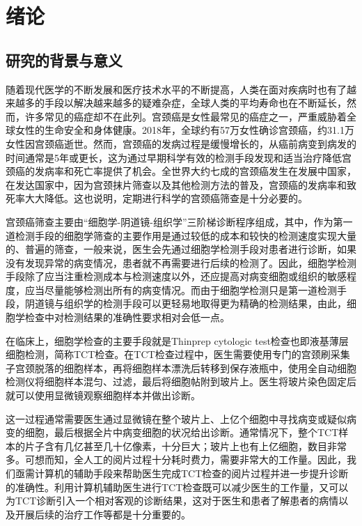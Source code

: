 \cleardoublepage

\section{绪论}

\subsection{研究的背景与意义}
\par 随着现代医学的不断发展和医疗技术水平的不断提高，人类在面对疾病时也有了越来越多的手段以解决越来越多的疑难杂症，全球人类的平均寿命也在不断延长，然而，许多常见的癌症却不在此列。宫颈癌是女性最常见的癌症之一，严重威胁着全球女性的生命安全和身体健康。2018年，全球约有57万女性确诊宫颈癌，约31.1万女性因宫颈癌逝世。然而，宫颈癌的发病过程是缓慢增长的，从癌前病变到病发的时间通常是5年或更长，这为通过早期科学有效的检测手段发现和适当治疗降低宫颈癌的发病率和死亡率提供了机会。全世界大约七成的宫颈癌发生在发展中国家\cite{wild2014world}，在发达国家中，因为宫颈抹片筛查以及其他检测方法的普及，宫颈癌的发病率和致死率大大降低\cite{canavan2000cervical}。这也说明，定期进行科学的宫颈癌筛查是十分必要的。
\par 宫颈癌筛查主要由“细胞学-阴道镜-组织学”三阶梯诊断程序组成，其中，作为第一道检测手段的细胞学筛查的主要作用是通过较低的成本和较快的检测速度实现大量的、普遍的筛查，一般来说，医生会先通过细胞学检测手段对患者进行诊断，如果没有发现异常的病变情况，患者就不再需要进行后续的检测了。因此，细胞学检测手段除了应当注重检测成本与检测速度以外，还应提高对病变细胞或组织的敏感程度，应当尽量能够检测出所有的病变情况。而由于细胞学检测只是第一道检测手段，阴道镜与组织学的检测手段可以更轻易地取得更为精确的检测结果，由此，细胞学检查中对检测结果的准确性要求相对会低一点。
\par 在临床上，细胞学检查的主要手段就是Thinprep cytologic test检查也即液基薄层细胞检测，简称TCT检查。在TCT检查过程中，医生需要使用专门的宫颈刷采集子宫颈脱落的细胞样本，再将细胞样本漂洗后转移到保存液瓶中，使用全自动细胞检测仪将细胞样本混匀、过滤，最后将细胞帖附到玻片上。医生将玻片染色固定后就可以使用显微镜观察细胞样本并做出诊断。
\par 这一过程通常需要医生通过显微镜在整个玻片上、上亿个细胞中寻找病变或疑似病变的细胞，最后根据全片中病变细胞的状况给出诊断。通常情况下，整个TCT样本的片子含有几亿甚至几十亿像素，十分巨大；玻片上也有上亿细胞，数目非常多。可想而知，全人工的阅片过程十分耗时费力，需要非常大的工作量。因此，我们亟需计算机的辅助手段来帮助医生完成TCT检查的阅片过程并进一步提升诊断的准确性。利用计算机辅助医生进行TCT检查既可以减少医生的工作量，又可以为TCT诊断引入一个相对客观的诊断结果，这对于医生和患者了解患者的病情以及开展后续的治疗工作等都是十分重要的。

